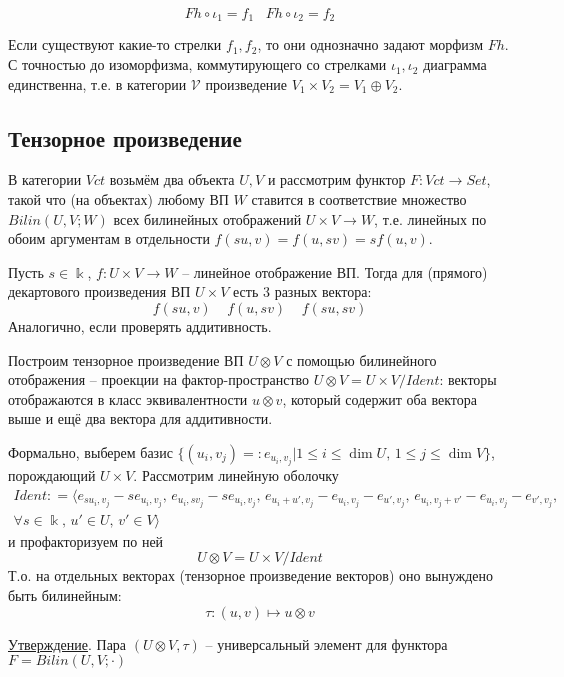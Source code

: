 \documentclass[a4paper, 12pt]{article}
\begin{document}
$$
Fh \circ \iota_1 = f_1 \;\;\;
Fh \circ \iota_2 = f_2
$$

Если существуют какие-то стрелки $f_1, f_2$, то они однозначно задают морфизм $Fh$.\\
С точностью до изоморфизма, коммутирующего со стрелками $\iota_1, \iota_2$ диаграмма единственна, т.е. в категории $\mathcal{V}$ произведение $V_1 \times V_2 = V_1 \oplus V_2$.


\subsection*{Тензорное произведение}

В категории $Vct$ возьмём два объекта $U, V$ и рассмотрим функтор $F: Vct \to Set$, такой что (на объектах) любому ВП $W$ ставится в соответствие множество $Bilin(U,V; W)$ всех билинейных отображений $U \times V \to W$, т.е. линейных по обоим аргументам в отдельности $f(su, v) = f(u, sv) = sf(u,v)$.

Пусть $s \in \Bbbk$, $f: U \times V \to W$ -- линейное отображение ВП. Тогда для (прямого) декартового произведения ВП $U \times V$ есть 3 разных вектора:
$$f(su, v) \;\;\;\; f(u, sv) \;\;\;\; f(su, sv)$$
Аналогично, если проверять аддитивность.

Построим тензорное произведение ВП $U \otimes V$ с помощью билинейного отображения -- проекции на фактор-пространство $U \otimes V = U \times V / Ident $: векторы отображаются в класс эквивалентности $u \otimes v$, который содержит оба вектора выше и ещё два вектора для аддитивности.

Формально, выберем базис $\{(u_i, v_j) =: e_{u_i, v_j} | 1 \leq i \leq \dim U, \, 1 \leq j \leq \dim V \}$, порождающий $U \times V$. Рассмотрим линейную оболочку
\begin{equation*}
\begin{split}
Ident: = \langle e_{su_i, v_j} - se_{u_i, v_j},  	\,
				e_{u_i, sv_j} - se_{u_i, v_j},		\,
				e_{u_i + u', v_j} - e_{u_i, v_j} - e_{u', v_j},	\,
				e_{u_i, v_j + v'} - e_{u_i, v_j} - e_{v', v_j},	\; \\
			\forall{s} \in \Bbbk, \, u' \in U, \, v' \in V \rangle
\end{split}
\end{equation*}
и профакторизуем по ней
$$
U \otimes V =  U \times V / Ident
$$
Т.о. на отдельных векторах (тензорное произведение векторов) оно вынуждено быть билинейным:
$$\tau: (u, v) \mapsto u \otimes v$$

\medskip
\underline{Утверждение}. Пара $(U \otimes V, \tau)$ -- универсальный элемент для функтора $F = Bilin(U,V; \cdot)$
\end{document}
